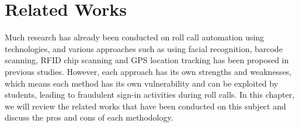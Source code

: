 \chapter{Related Works}
Much research has already been conducted on roll call automation using technologies, and various approaches
such as using facial recognition, barcode scanning, RFID chip scanning and GPS location tracking has been
proposed in previous studies. However, each approach has its own strengths and weaknesses, which means
each method has its own vulnerability and can be exploited by students, leading to fraudulent sign-in
activities during roll calls. In this chapter, we will review the related works that have been conducted
on this subject and discuss the pros and cons of each methodology.





